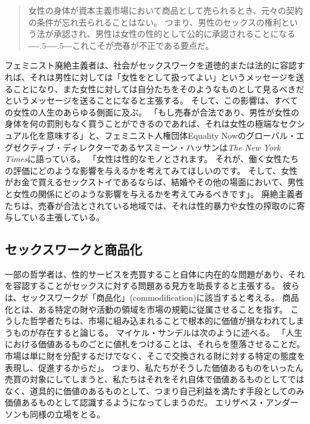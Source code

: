 \documentclass[paper=a4,book,openany]{jlreq}
\newcommand{\ig}[1]{}           %
\def\DDASH{―\kern-.5\zw―\kern-.5\zw―} %
\begin{document}
\begin{quote}
女性の身体が資本主義市場において商品として売られるとき、元々の契約の条件が忘れ去られることはない。
つまり、男性のセックスの権利という法が承認され、男性は女性の性的として公的に承認されることになる{\DDASH}これこそが売春が不正である要点だ。
\citep[p.208]{pateman88:_sexual_contr}
\end{quote}

フェミニスト廃絶主義者は、社会がセックスワークを道徳的または法的に容認すれば、それは男性に対しては「女性をとして扱ってよい」というメッセージを送ることになり、また女性に対しては自分たちをそのようなものとして見るべきだというメッセージを送ることになると主張する。
そして、この影響は、すべての女性の人生のあらゆる側面に及ぶ。
「もし売春が合法であり、男性が女性の身体を何の罰則もなく買うことができるのであれば、それは女性の極端なセクシュアル化を意味する」と、フェミニスト人権団体Equality Nowのグローバル・エグゼクティブ・ディレクターであるヤスミーン・ハッサンは\emph{The New York Times}に語っている。
「女性は性的なモノとされます。
それが、働く女性たちの評価にどのような影響を与えるかを考えてみてほしいのです。
そして、女性がお金で買えるセックストイであるならば、結婚やその他の場面において、男性と女性の関係にどのような影響を与えるかを考えてみるべきです」\citep{bazelon16:_shoul_prost_be_crime}。
廃絶主義者たちは、売春が合法とされている地域では、それは性的暴力や女性の搾取のに寄与している主張している\citep[p.3]{waltman10:_prohib_purch_sex_sweden}。

\subsection{セックスワークと商品化}

一部の哲学者は、性的サービスを売買すること自体に内在的な問題があり、それを容認することがセックスに対する問題ある見方を助長すると主張する。
彼らは、セックスワークが「商品化」(commodification)に該当すると考える。
商品化とは、ある特定の財や活動の領域を市場の規範に従属させることを指す。
こうした哲学者たちは、市場に組み込まれることで根本的に価値が損なわれてしまうものが存在すると論じる。
マイケル・サンデルは次のように述べる。
「人生における価値あるものごとに値札をつけることは、それらを堕落させることだ。
市場は単に財を分配するだけでなく、そこで交換される財に対する特定の態度を表現し、促進するからだ」\citep[p.9]{sandel12:money_cant_buy}。
つまり、私たちがそうした価値あるものをいったん売買の対象にしてしまうと、私たちはそれをそれ自体で価値あるものとしてではなく、道具的に価値のあるものとして、つまり自己利益を満たす手段としてのみ価値あるものとして認識するようになってしまうのだ。
エリザベス・アンダーソン\ig{Elizabeth Anderson}も同様の立場をとる。
\end{document}
